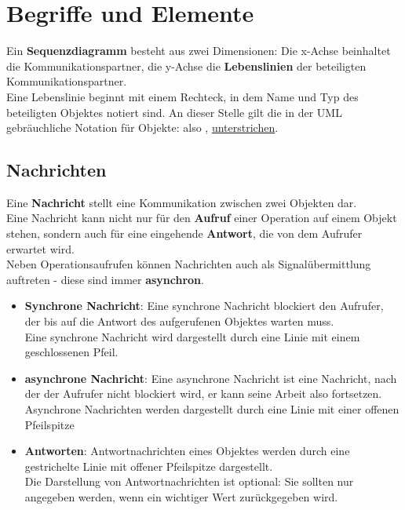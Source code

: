 \section{Begriffe und Elemente}\label{sec:sd-begriffe-und-elemente}

Ein \textbf{Sequenzdiagramm} besteht aus zwei Dimensionen: Die x-Achse beinhaltet die Kommunikationspartner, die y-Achse die \textbf{Lebenslinien} der beteiligten Kommunikationspartner.\\

\noindent
Eine Lebenslinie beginnt mit einem Rechteck, in dem Name und Typ des beteiligten Objektes notiert sind.
An dieser Stelle gilt die in der UML gebräuchliche Notation für Objekte: also , \underline{unterstrichen}.

\subsection{Nachrichten}
Eine \textbf{Nachricht} stellt eine Kommunikation zwischen zwei Objekten dar.\\
Eine Nachricht kann nicht nur für den \textbf{Aufruf} einer Operation auf einem Objekt stehen, sondern auch für eine eingehende \textbf{Antwort}, die von dem Aufrufer erwartet wird.\\
Neben Operationsaufrufen können Nachrichten auch als Signalübermittlung auftreten - diese sind immer \textbf{asynchron}.

\begin{itemize}
    \item \textbf{Synchrone Nachricht}: Eine synchrone Nachricht blockiert den Aufrufer, der bis auf die Antwort des aufgerufenen Objektes warten muss.\\
    Eine synchrone Nachricht wird dargestellt durch eine Linie mit einem geschlossenen Pfeil.
    \item \textbf{asynchrone Nachricht}: Eine asynchrone Nachricht ist eine Nachricht, nach der der Aufrufer nicht blockiert wird, er kann seine Arbeit also fortsetzen.\\
    Asynchrone Nachrichten werden dargestellt durch eine Linie mit einer offenen Pfeilspitze
    \item \textbf{Antworten}: Antwortnachrichten eines Objektes werden durch eine gestrichelte Linie mit offener Pfeilspitze dargestellt. \\
    Die Darstellung von Antwortnachrichten ist optional: Sie sollten nur angegeben werden, wenn ein wichtiger Wert zurückgegeben wird.
\end{itemize}

